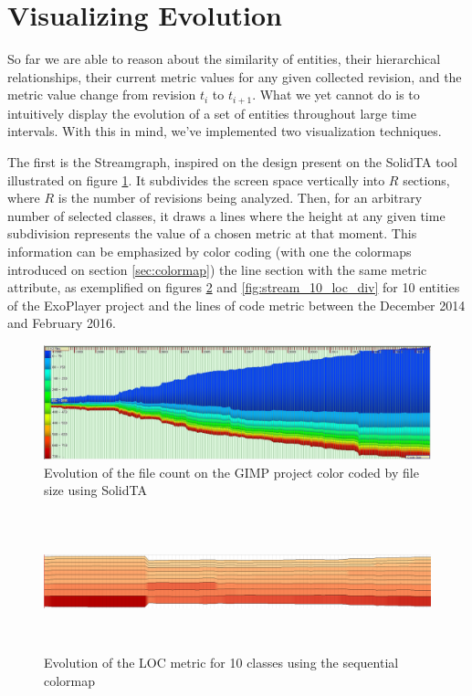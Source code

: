 \section{Visualizing Evolution} \label{sec:evolution}
So far we are able to reason about the similarity of entities, their hierarchical relationships, their current metric values for any given collected revision, and the metric value change from revision $t_{i}$ to $t_{i+1}$. What we yet cannot do is to intuitively display the evolution of a set of entities throughout large time intervals. With this in mind, we've implemented two visualization techniques.

The first is the Streamgraph, inspired on the design present on the SolidTA tool \cite{ref:solid} illustrated on figure \ref{fig:flow_solid}. It subdivides the screen space vertically into $R$ sections, where $R$ is the number of revisions being analyzed. Then, for an arbitrary number of selected classes, it draws a lines where the height at any given time subdivision represents the  value of a chosen metric at that moment. This information can be emphasized by color coding (with one the colormaps introduced on section \ref{sec:colormap}) the line section with the same metric attribute, as exemplified on figures \ref{fig:stream_10_loc} and \ref{fig:stream_10_loc_div} for 10 entities of the ExoPlayer project and the lines of code metric between the December 2014 and February 2016.

\begin{figure}[H]
	\centering
	\includegraphics[width=1.0\textwidth]{figures/flow_graph.png}
	\caption{Evolution of the file count on the GIMP project color coded by file size using SolidTA}
	\label{fig:flow_solid}
\end{figure}


\begin{figure}[H]
	\centering
	\includegraphics[width=1.0\textwidth,height=4.0cm]{figures/stream_10_loc.png}
	\caption{Evolution of the LOC metric for 10 classes using the sequential colormap}
	\label{fig:stream_10_loc}
\end{figure}

